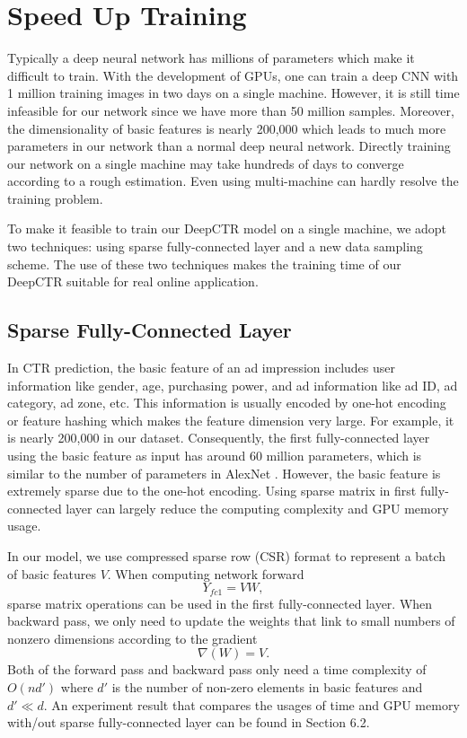 \documentclass{sig-alternate}
\begin{document}
\section{Speed Up Training}
Typically a deep neural network has millions of parameters which make it difficult to train. With the development of GPUs, one can train a deep CNN with 1 million training images in two days on a single machine. However, it is still time infeasible for our network since we have more than 50 million samples. Moreover, the dimensionality of basic features is nearly 200,000 which leads to much more parameters in our network than a normal deep neural network. Directly training our network on a single machine may take hundreds of days to converge according to a rough estimation. Even using multi-machine can hardly resolve the training problem.

To make it feasible to train our DeepCTR model on a single machine, we adopt two techniques: using sparse fully-connected layer and a new data sampling scheme. The use of these two techniques makes the training time of our DeepCTR suitable for real online application.
\subsection{Sparse Fully-Connected Layer}
In CTR prediction, the basic feature of an ad impression includes user information like gender, age, purchasing power, and ad information like ad ID, ad category, ad zone, etc. This information is usually encoded by one-hot encoding or feature hashing \cite{weinberger2009feature} which makes the feature dimension very large. For example, it is nearly 200,000 in our dataset. Consequently, the first fully-connected layer using the basic feature as input has around 60 million parameters, which is similar to the number of  parameters in  AlexNet \cite{NIPS2012_4824}. However, the basic feature is extremely sparse due to the one-hot encoding. Using sparse matrix in first fully-connected layer can largely reduce the computing complexity and GPU memory usage.

In our model, we use compressed sparse row (CSR) format to represent a batch of basic features $V$. When computing network forward 
\begin{equation}
Y_{fc1} = VW,
\end{equation}
sparse matrix operations  can be used in the first fully-connected layer. When backward pass,  we only need to update the weights that link to small numbers of nonzero dimensions according to the gradient
\begin{equation}
\nabla(W) = V.
\end{equation}
Both of the forward pass and backward pass only need a time complexity of $O(nd')$ where $d'$ is the number of  non-zero elements in basic features and $d' \ll d$. An experiment result that compares the usages of time and GPU memory with/out sparse fully-connected layer can be found in Section 6.2.
\end{document}
